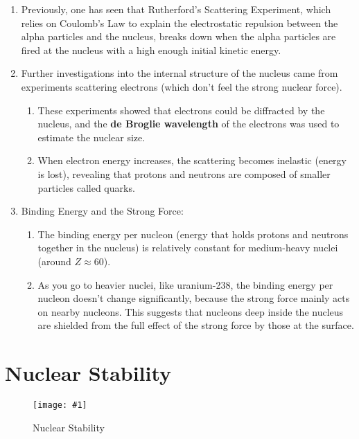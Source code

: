 \documentclass[a4paper,12pt]{article}
\let\oldsection\section
\renewcommand\section{\clearpage\oldsection}
\newcommand{\img}[4]{\begin{center}
  \begin{figure}[H]
    \centering
    \texttt{[image: \#1]}
    \caption{#3}
    \label{fig:#4}
  \end{figure}
\end{center}}
\begin{document}
\begin{enumerate}
  \item Previously, one has seen that Rutherford's Scattering Experiment, which relies on Coulomb's Law to explain the electrostatic repulsion between the alpha particles and the nucleus, breaks down when the alpha particles are fired at the nucleus with a high enough initial kinetic energy.
  \item Further investigations into the internal structure of the nucleus came from experiments scattering electrons (which don't feel the strong nuclear force).
        \begin{enumerate}
          \item These experiments showed that electrons could be diffracted by the nucleus, and the \textbf{de Broglie wavelength} of the electrons was used to estimate the nuclear size.
          \item When electron energy increases, the scattering becomes inelastic (energy is lost), revealing that protons and neutrons are composed of smaller particles called quarks.
        \end{enumerate}
  \item Binding Energy and the Strong Force:
        \begin{enumerate}
          \item The binding energy per nucleon (energy that holds protons and neutrons together in the nucleus) is relatively constant for medium-heavy nuclei (around $Z \approx 60$).
          \item As you go to heavier nuclei, like uranium-238, the binding energy per nucleon doesn't change significantly, because the strong force mainly acts on nearby nucleons. This suggests that nucleons deep inside the nucleus are shielded from the full effect of the strong force by those at the surface.
        \end{enumerate}
\end{enumerate}

\section{Nuclear Stability}

\img{stability graph.png}{0.8}{Nuclear Stability}{stability}
\end{document}

